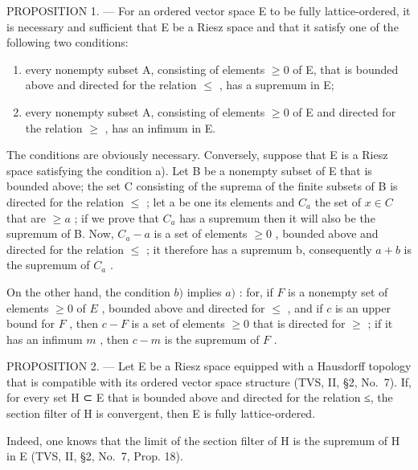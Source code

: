 PROPOSITION 1. --- For an ordered vector space E to be fully lattice-ordered, it is necessary and sufficient that E be a Riesz space and that it satisfy one of the following two conditions:

\begin{enumerate}
\def\labelenumi{\alph{enumi})}
\item
  every nonempty subset A, consisting of elements \(\geqslant0\) of E, that is bounded above and directed for the relation \(\leqslant\) , has a supremum in E;
\item
  every nonempty subset A, consisting of elements \(\geqslant 0\) of E and directed for the relation \(\geqslant\) , has an infimum in E.
\end{enumerate}

The conditions are obviously necessary. Conversely, suppose that E is a Riesz space satisfying the condition a). Let B be a nonempty subset of E that is bounded above; the set C consisting of the suprema of the finite subsets of B is directed for the relation \(\leqslant\) ; let a be one its elements and \(C_{a}\) the set of \(x \in C\) that are \(\geqslant a\) ; if we prove that \(C_{a}\) has a supremum then it will also be the supremum of B. Now, \(C_{a} - a\) is a set of elements \(\geqslant 0\) , bounded above and directed for the relation \(\leqslant\) ; it therefore has a supremum b, consequently \(a + b\) is the supremum of \(C_{a}\) .

On the other hand, the condition \(b)\) implies \(a)\) : for, if \(F\) is a nonempty set of elements \(\geqslant 0\) of \(E\) , bounded above and directed for \(\leqslant\) , and if \(c\) is an upper bound for \(F\) , then \(c - F\) is a set of elements \(\geqslant 0\) that is directed for \(\geqslant\) ; if it has an infimum \(m\) , then \(c - m\) is the supremum of \(F\) .

PROPOSITION 2. --- Let E be a Riesz space equipped with a Hausdorff topology that is compatible with its ordered vector space structure (TVS, II, §2, No.~7). If, for every set H ⊂ E that is bounded above and directed for the relation ≤, the section filter of H is convergent, then E is fully lattice-ordered.

Indeed, one knows that the limit of the section filter of H is the supremum of H in E (TVS, II, §2, No.~7, Prop. 18).

